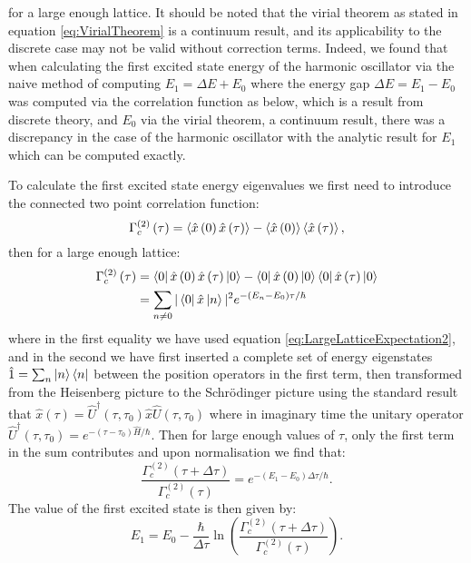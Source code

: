 \documentclass[12pt]{article}
\begin{document}
         for a large enough lattice. It should be noted that the virial theorem as stated in equation \ref{eq:VirialTheorem} is a continuum result, and its applicability to the discrete case may not be valid without correction terms. Indeed, we found that when calculating the first excited state energy of the harmonic oscillator via the naive method of computing $E_1 = \Delta E + E_0$ where the energy gap $\Delta E = E_1 - E_0$ was computed via the correlation function as below, which is a result from discrete theory, and $E_0$ via the virial theorem, a continuum result, there was a discrepancy in the case of the harmonic oscillator with the analytic result for $E_1$ which can be computed exactly.

         To calculate the first excited state energy eigenvalues we first need to introduce the connected two point correlation function:
         \begin{equation}
            \label{eq:2pointCorrelation}
            \Gamma^{\left(2\right)}_{c}\left(\tau\right) = \braket{\hat{x}\left(0\right)\hat{x}\left(\tau\right)} - \braket{\hat{x}\left(0\right)}\braket{\hat{x}\left(\tau\right)},
        \end{equation}
        then for a large enough lattice:
        \begin{align}
            \label{eq:GammaLargeLattice1}\Gamma^{\left(2\right)}_{c}\left(\tau\right) & = \bra{0}\hat{x}\left(0\right)\hat{x}\left(\tau\right)\ket{0} - \bra{0}\hat{x}\left(0\right)\ket{0}\bra{0}\hat{x}\left(\tau\right)\ket{0} \\
            \label{eq:GammaLargeLattice2}& = \sum_{n\neq0}|\bra{0}\hat{x}\ket{n}|^2e^{-\left(E_n-E_0\right)\tau/\hbar}
        \end{align}
        where in the first equality we have used equation \ref{eq:LargeLatticeExpectation2}, and in the second we have first inserted a complete set of energy eigenstates $\hat{1}=\sum_n \ket{n}\bra{n}$ between the position operators in the first term, then transformed from the Heisenberg picture to the Schr\"{o}dinger picture using the standard result that $\hat{x}\left(\tau\right)=\hat{U}^{\dagger}\left(\tau,\tau_0\right)\hat{x}\hat{U}\left(\tau,\tau_0\right)$ where in imaginary time the unitary operator $\hat{U}^{\dagger}\left(\tau,\tau_0\right)=e^{-\left(\tau-\tau_0\right)\hat{H}/\hbar}$. Then for large enough values of $\tau$, only the first term in the sum contributes and upon normalisation we find that:
        \begin{equation}
            \label{eq:GammaNorm}
            \frac{\Gamma^{\left(2\right)}_{c}\left(\tau+\Delta\tau\right)}{\Gamma^{\left(2\right)}_{c}\left(\tau\right)} = e^{-\left(E_1-E_0\right)\Delta\tau/\hbar}.
        \end{equation}
        The value of the first excited state is then given by:
        \begin{equation}
            E_1 = E_0 - \frac{\hbar}{\Delta\tau}\ln\left(\frac{\Gamma^{\left(2\right)}_{c}\left(\tau+\Delta\tau\right)}{\Gamma^{\left(2\right)}_{c}\left(\tau\right)}\right). 
        \end{equation}
\end{document}
